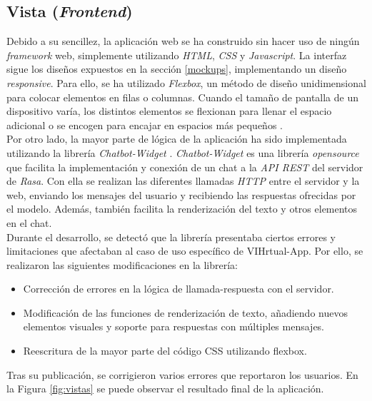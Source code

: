 \subsection{Vista (\textit{Frontend})}
Debido a su sencillez, la aplicación web se ha construido sin hacer uso de ningún \textit{framework} web, simplemente utilizando \textit{HTML}, \textit{CSS} y \textit{Javascript}. La interfaz sigue los diseños expuestos en la sección \ref{mockups}, implementando un diseño \textit{responsive}. Para ello, se ha utilizado \textit{Flexbox}, un método de diseño unidimensional para colocar elementos en filas o columnas. Cuando el tamaño de pantalla de un dispositivo varía, los distintos elementos se flexionan para llenar el espacio adicional o se encogen para encajar en espacios más pequeños \cite{flexbox}.\\ 

Por otro lado, la mayor parte de lógica de la aplicación ha sido implementada utilizando la librería \textit{Chatbot-Widget} \cite{chatbotwidget}. \textit{Chatbot-Widget} es una librería \textit{opensource} que facilita la implementación y conexión de un chat a la \textit{API REST} del servidor de \textit{Rasa}. Con ella se realizan las diferentes llamadas \textit{HTTP} entre el servidor y la web, enviando los mensajes del usuario y recibiendo las respuestas ofrecidas por el modelo. Además, también facilita la renderización del texto y otros elementos en el chat.\\

Durante el desarrollo, se detectó que la librería presentaba ciertos errores y limitaciones que afectaban al caso de uso específico de VIHrtual-App. Por ello, se realizaron las siguientes modificaciones en la librería:

\begin{itemize}
	\item Corrección de errores en la lógica de llamada-respuesta con el servidor.
	\item Modificación de las funciones de renderización de texto, añadiendo nuevos elementos visuales y soporte para respuestas con múltiples mensajes.
	\item Reescritura de la mayor parte del código CSS utilizando flexbox.
\end{itemize}

Tras su publicación, se corrigieron varios errores que reportaron los usuarios. En la Figura \ref{fig:vistas} se puede observar el resultado final de la aplicación.

